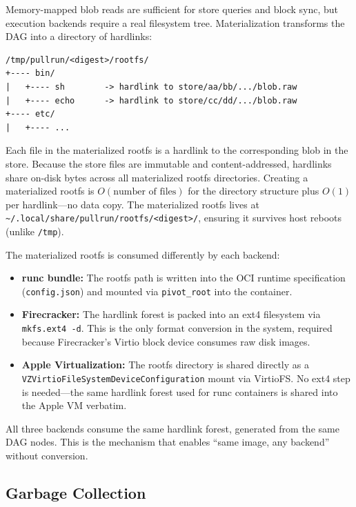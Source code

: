 \documentclass[11pt,a4paper]{article}
\begin{document}
Memory-mapped blob reads are sufficient for store queries and block sync, but execution backends require a real filesystem tree. Materialization transforms the DAG into a directory of hardlinks:

\begin{verbatim}
/tmp/pullrun/<digest>/rootfs/
+---- bin/
|   +---- sh        -> hardlink to store/aa/bb/.../blob.raw
|   +---- echo      -> hardlink to store/cc/dd/.../blob.raw
+---- etc/
|   +---- ...
\end{verbatim}

Each file in the materialized rootfs is a hardlink to the corresponding blob in the store. Because the store files are immutable and content-addressed, hardlinks share on-disk bytes across all materialized rootfs directories. Creating a materialized rootfs is $O(\text{number of files})$ for the directory structure plus $O(1)$ per hardlink---no data copy. The materialized rootfs lives at \texttt{\textasciitilde/.local/share/pullrun/rootfs/<digest>/}, ensuring it survives host reboots (unlike \texttt{/tmp}).

The materialized rootfs is consumed differently by each backend:
\begin{itemize}[leftmargin=*]
    \item \textbf{runc bundle:} The rootfs path is written into the OCI runtime specification (\texttt{config.json}) and mounted via \texttt{pivot\_root} into the container.
    \item \textbf{Firecracker:} The hardlink forest is packed into an ext4 filesystem via \texttt{mkfs.ext4 -d}. This is the only format conversion in the system, required because Firecracker's Virtio block device consumes raw disk images.
    \item \textbf{Apple Virtualization:} The rootfs directory is shared directly as a \texttt{VZVirtioFileSystemDeviceConfiguration} mount via VirtioFS. No ext4 step is needed---the same hardlink forest used for runc containers is shared into the Apple VM verbatim.
\end{itemize}

All three backends consume the same hardlink forest, generated from the same DAG nodes. This is the mechanism that enables ``same image, any backend'' without conversion.

\subsection{Garbage Collection}
\end{document}
